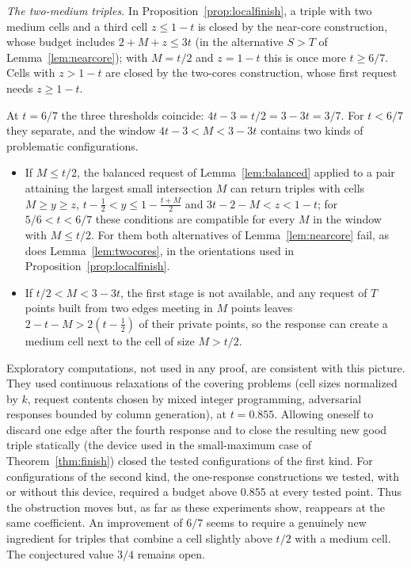 \documentclass[11pt]{article}
\numberwithin{equation}{section}
\theoremstyle{definition}
\theoremstyle{remark}
\begin{document}
\emph{The two-medium triples.} In Proposition~\ref{prop:localfinish}, a
triple with two medium cells and a third cell $z\le1-t$ is closed by the
near-core construction, whose budget includes $2+M+z\le3t$ (in the
alternative $S>T$ of Lemma~\ref{lem:nearcore}); with $M=t/2$ and $z=1-t$
this is once more $t\ge6/7$. Cells with $z>1-t$ are closed by the
two-cores construction, whose first request needs $z\ge1-t$.

At $t=6/7$ the three thresholds coincide: $4t-3=t/2=3-3t=3/7$. For
$t<6/7$ they separate, and the window $4t-3<M<3-3t$ contains two kinds
of problematic configurations.
\begin{itemize}[leftmargin=2em]
\item If $M\le t/2$, the balanced request of Lemma~\ref{lem:balanced}
applied to a pair attaining the largest small intersection $M$ can
return triples with cells $M\ge y\ge z$, $t-\tfrac12<y\le1-\tfrac{t+M}2$
and $3t-2-M<z<1-t$; for $5/6<t<6/7$ these conditions are compatible
for every $M$ in the window with $M\le t/2$. For them both alternatives of Lemma~\ref{lem:nearcore} fail,
as does Lemma~\ref{lem:twocores}, in the orientations used in
Proposition~\ref{prop:localfinish}.
\item If $t/2<M<3-3t$, the first stage is not available, and any request
of $T$ points built from two edges meeting in $M$ points leaves
$2-t-M>2(t-\tfrac12)$ of their private points, so the response can
create a medium cell next to the cell of size $M>t/2$.
\end{itemize}
Exploratory computations, not used in any proof, are consistent with
this picture. They used continuous relaxations of the covering problems
(cell sizes normalized by $k$, request contents chosen by mixed integer
programming, adversarial responses bounded by column generation), at
$t=0.855$. Allowing oneself to discard one edge after the fourth
response and to close the resulting new good triple statically (the
device used in the small-maximum case of Theorem~\ref{thm:finish})
closed the tested configurations of the first kind. For configurations
of the second kind, the one-response constructions we tested, with or
without this device, required a budget above $0.855$ at every tested
point. Thus the obstruction moves but, as far as these experiments show,
reappears at the same coefficient. An improvement of $6/7$ seems to require a genuinely new
ingredient for triples that combine a cell slightly above $t/2$ with a
medium cell. The conjectured value $3/4$ remains open.

\appendix
\end{document}
